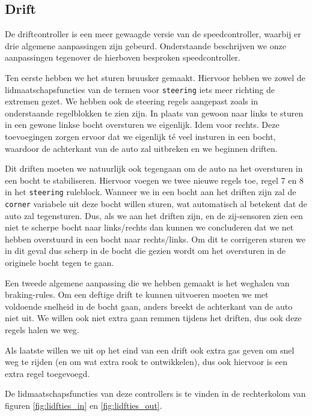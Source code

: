 \subsection{Drift}
De driftcontroller is een meer gewaagde versie van de speedcontroller, waarbij 
er drie algemene aanpassingen zijn gebeurd. Onderstaande beschrijven we onze 
aanpassingen tegenover de hierboven besproken speedcontroller.

Ten eerste hebben we het sturen bruusker gemaakt. Hiervoor hebben we zowel de
lidmaatschapsfuncties van de termen voor \texttt{steering} iets meer richting de extremen gezet.
We hebben ook de steering regels aangepast zoals in onderstaande regelblokken te zien
zijn. In plaats van gewoon naar links te sturen in een gewone linkse bocht
oversturen we eigenlijk. Idem voor rechts. Deze toevoegingen zorgen ervoor dat
we eigenlijk té veel insturen in een bocht, waardoor de achterkant van de auto
zal uitbreken en we beginnen driften.

Dit driften moeten we natuurlijk ook tegengaan om de auto na het oversturen in
een bocht te stabiliseren. Hiervoor voegen we twee nieuwe regels toe, regel 7 en
8 in het \texttt{steering} ruleblock. Wanneer we in een bocht aan het driften
zijn zal de \texttt{corner} variabele uit deze bocht willen sturen, wat
automatisch al betekent dat de auto zal tegensturen. Dus, als we aan het driften
zijn, en de zij-sensoren zien een niet te scherpe bocht naar links/rechts dan
kunnen we concluderen dat we net hebben overstuurd in een bocht naar
rechts/links. Om dit te corrigeren sturen we in dit geval dus scherp in de bocht
die gezien wordt om het oversturen in de originele bocht tegen te gaan.

Een tweede algemene aanpassing die we hebben gemaakt is het weghalen van 
braking-rules. Om een deftige drift te kunnen uitvoeren moeten we met voldoende 
snelheid in de bocht gaan, anders breekt de achterkant van de auto niet uit. We 
willen ook niet extra gaan remmen tijdens het driften, dus ook deze regels 
halen we weg. 

Als laatste willen we uit op het eind van een drift ook extra gas geven om snel 
weg te rijden (en om wat extra rook te ontwikkelen), dus ook hiervoor is een 
extra regel toegevoegd.

De lidmaatschapsfuncties van deze controllers is te vinden in de rechterkolom 
van figuren \ref{fig:lidfties_in} en \ref{fig:lidfties_out}.

